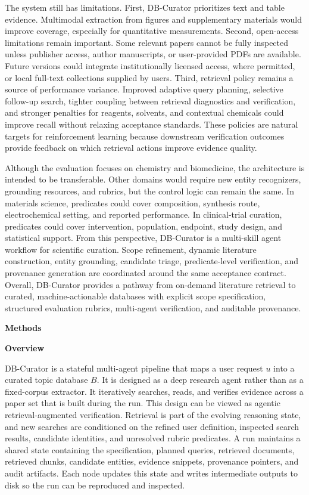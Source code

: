 \documentclass[
]{article}
\begin{document}
The system still has limitations. First, DB-Curator prioritizes text and
table evidence. Multimodal extraction from figures and supplementary
materials would improve coverage, especially for quantitative
measurements. Second, open-access limitations remain important. Some
relevant papers cannot be fully inspected unless publisher access, author
manuscripts, or user-provided PDFs are available. Future versions could
integrate institutionally licensed access, where permitted, or local
full-text collections supplied by users. Third, retrieval policy remains
a source of performance variance. Improved adaptive query planning,
selective follow-up search, tighter coupling between retrieval diagnostics
and verification, and stronger penalties for reagents, solvents, and
contextual chemicals could improve recall without relaxing acceptance
standards. These policies are natural targets for reinforcement learning
because downstream verification outcomes provide feedback on which
retrieval actions improve evidence quality.

Although the evaluation focuses on chemistry and biomedicine, the
architecture is intended to be transferable. Other domains would require
new entity recognizers, grounding resources, and rubrics, but the control
logic can remain the same. In materials science, predicates could cover
composition, synthesis route, electrochemical setting, and reported
performance. In clinical-trial curation, predicates could cover
intervention, population, endpoint, study design, and statistical support.
From this perspective, DB-Curator is a multi-skill agent workflow for
scientific curation. Scope refinement, dynamic literature construction,
entity grounding, candidate triage, predicate-level verification, and
provenance generation are coordinated around the same acceptance contract.
Overall, DB-Curator provides a pathway from on-demand literature retrieval
to curated, machine-actionable databases with explicit scope
specification, structured evaluation rubrics, multi-agent verification,
and auditable provenance.


\textbf{Methods}

\textbf{Overview}

DB-Curator is a stateful multi-agent pipeline that maps a user request
\(u\) into a curated topic database \(B\). It is designed as a deep
research agent rather than as a fixed-corpus extractor. It iteratively
searches, reads, and verifies evidence across a paper set that is built
during the run. This design can be viewed as agentic
retrieval-augmented verification. Retrieval is part of the evolving
reasoning state, and new searches are conditioned on the refined user
definition, inspected search results, candidate identities, and
unresolved rubric predicates.
A run maintains a shared state containing the specification, planned
queries, retrieved documents, retrieved chunks, candidate entities,
evidence snippets, provenance pointers, and audit artifacts. Each node
updates this state and writes intermediate outputs to disk so the run
can be reproduced and inspected.
\end{document}
